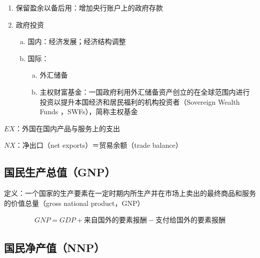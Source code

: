 \documentclass[12pt]{book}
\begin{document}
{\begin{enumerate}[1.]
\begin{enumerate}[(1)]
        \item 保留盈余以备后用：增加央行账户上的政府存款  
        \item 政府投资  
        \begin{enumerate}[a.]
            \item 国内：经济发展；经济结构调整  
            \item 国际：  
            \begin{enumerate}[(a)]
                \item 外汇储备  
                \item 主权财富基金：一国政府利用外汇储备资产创立的在全球范围内进行投资以提升本国经济和居民福利的机构投资者（Sovereign Wealth Funds ，SWFs），简称主权基金
            \end{enumerate}
        \end{enumerate}
    \end{enumerate}
\end{enumerate}
    
    
}


$EX$：外国在国内产品与服务上的支出

$NX$：净出口（net exports）＝贸易余额（trade balance）


\subsection{国民生产总值（GNP）}

定义：一个国家的生产要素在一定时期内所生产并在市场上卖出的最终商品和服务的价值总量（gross national product，GNP）

\begin{align*}
    GNP=GDP+\text{来自国外的要素报酬}-\text{支付给国外的要素报酬}
\end{align*}


\subsection{国民净产值（NNP）}
\end{document}

